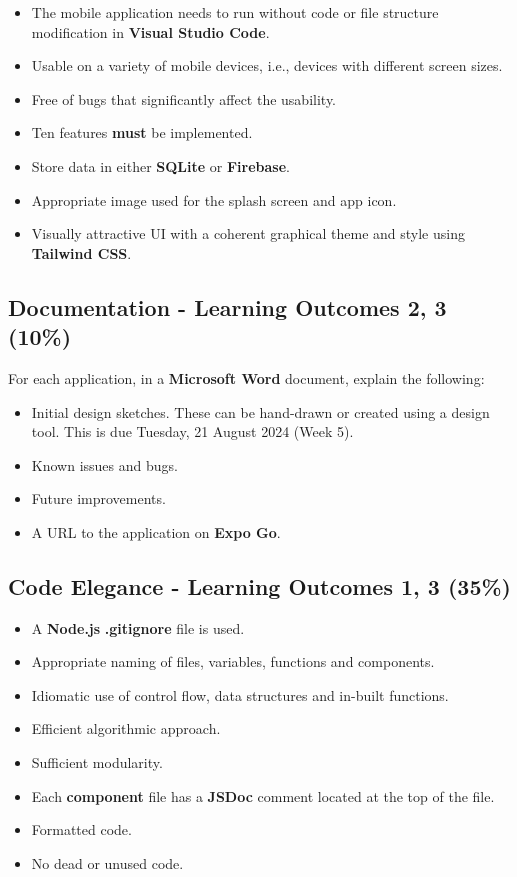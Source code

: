 \documentclass{article}
\begin{document}
\begin{itemize}
  \begin{itemize}
    \item The mobile application needs to run without code or file structure modification in \textbf{Visual Studio Code}.
    \item Usable on a variety of mobile devices, i.e., devices with different screen sizes.
    \item Free of bugs that significantly affect the usability.
    \item Ten features \textbf{must} be implemented.
    \item Store data in either \textbf{SQLite} or \textbf{Firebase}. 
    \item Appropriate image used for the splash screen and app icon.
    \item Visually attractive UI with a coherent graphical theme and style using \textbf{Tailwind CSS}.
  \end{itemize}
\end{itemize}

\subsection*{Documentation - Learning Outcomes 2, 3 (10\%)}
For each application, in a \textbf{Microsoft Word} document, explain the following:
\begin{itemize}
  \item Initial design sketches. These can be hand-drawn or created using a design tool. This is due Tuesday, 21 August 2024 (Week 5).
  \item Known issues and bugs.
  \item Future improvements.
  \item A URL to the application on \textbf{Expo Go}.
\end{itemize}

\subsection*{Code Elegance - Learning Outcomes 1, 3 (35\%)}
\begin{itemize}
  \item A \textbf{Node.js} \textbf{.gitignore} file is used.
  \item Appropriate naming of files, variables, functions and components.
  \item Idiomatic use of control flow, data structures and in-built functions.
  \item Efficient algorithmic approach.
  \item Sufficient modularity.
  \item Each \textbf{component} file has a \textbf{JSDoc} comment located at the top of the file.
  \item Formatted code.
  \item No dead or unused code. 
\end{itemize}
\end{document}
